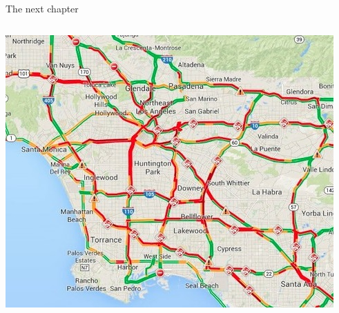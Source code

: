 \documentclass[serif]{beamer}\usepackage[]{graphicx}\usepackage[]{color}
\begin{document}
\begin{frame}{The next chapter}{}
\begin{columns}[t]
\begin{column}{0.5\textwidth}
\includegraphics[trim= 0cm 0cm 0cm 1.35cm, clip=true,width = \textwidth]{fig/latraffic.jpg}
\end{column}
\end{columns}
\end{frame}
\end{document}
